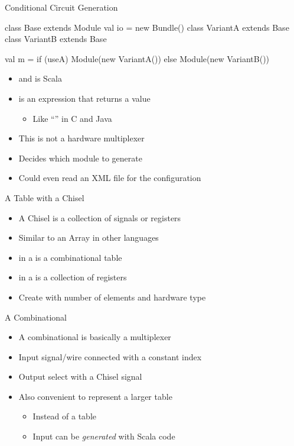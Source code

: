 \begin{frame}[fragile]{Conditional Circuit Generation}
\begin{chisel}
class Base extends Module { val io = new Bundle() }
class VariantA extends Base { }
class VariantB extends Base { }

val m = if (useA) Module(new VariantA())
        else Module(new VariantB())
\end{chisel}
\begin{itemize}
\item {} and  is Scala
\item {} is an expression that returns a value
\begin{itemize}
\item Like ``'' in C and Java
\end{itemize}
\item This is not a hardware multiplexer
\item Decides which module to generate
\item Could even read an XML file for the configuration
\end{itemize}
\end{frame}


\begin{frame}[fragile]{A Table with a Chisel }
\begin{itemize}
\item A Chisel  is a collection of signals or registers
\item Similar to an Array in other languages
\item {} in a  is a combinational table
\item {} in a  is a collection of registers
\item Create with number of elements and hardware type
\end{itemize}
\end{frame}

\begin{frame}[fragile]{A Combinational }
\begin{itemize}
\item A combinational  is basically a multiplexer
\item Input signal/wire connected with a constant index
\item Output select with a Chisel  signal
\end{itemize}
\begin{itemize}
\item Also convenient to represent a larger table
\begin{itemize}
\item Instead of a  table
\item Input can be \emph{generated} with Scala code
\end{itemize}
\end{itemize}
\end{frame}

